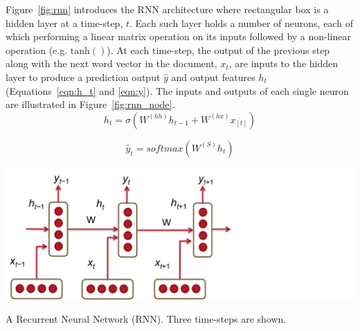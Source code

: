 \documentclass{tufte-handout}
\begin{document}
Figure~\ref{fig:rnn} introduces the RNN architecture where rectangular box is a hidden layer at a time-step, $t$. Each such layer holds a number of neurons, each of which performing a linear matrix operation on its inputs followed by a non-linear operation (e.g. $\operatorname{tanh()}$). At each time-step, the output of the previous step along with the next word vector in the document, $x_t$, are inputs to the hidden layer to produce a prediction output $\hat{y}$ and output features $h_t$ (Equations~\ref{eqn:h_t} and \ref{eqn:y}). The inputs and outputs of each single neuron are illustrated in Figure~\ref{fig:rnn_node}.
\begin{equation}
	h_t = \sigma (W^{(hh)}h_{t-1} + W^{(hx)}x_{[t]})
	\label{eqn:h_t}
\end{equation}

\begin{equation}
	\hat{y}_t = softmax(W^{(S)}h_t)
	\label{eqn:y}
\end{equation}

\begin{marginfigure}
	\centering
	\includegraphics[width=\linewidth]{rnn.pdf}
	\caption {A Recurrent Neural Network (RNN). Three time-steps are shown.}
	\label{fig:rnn}
\end{marginfigure}
\end{document}
